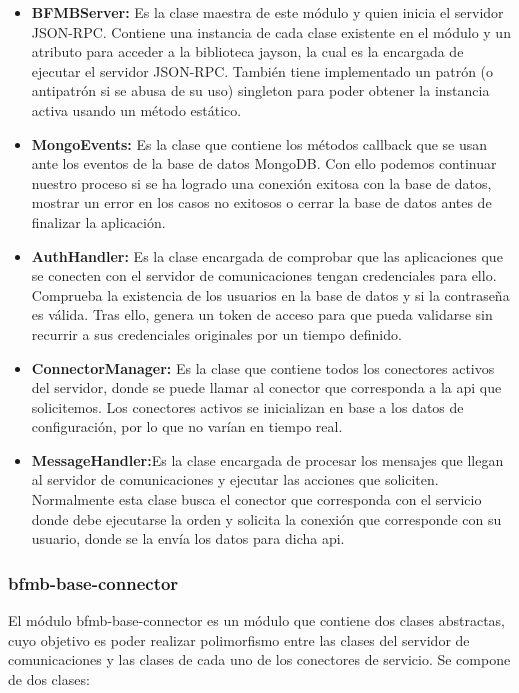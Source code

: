 \documentclass[spanish,12pt, a4paper, twoside]{paper}
\begin{document}
\begin{itemize}
\item\textbf{BFMBServer:} Es la clase maestra de este módulo y quien inicia el servidor JSON-RPC. Contiene una instancia de cada clase existente en el módulo y un atributo para acceder a la biblioteca jayson, la cual es la encargada de ejecutar el servidor JSON-RPC. También tiene implementado un patrón (o antipatrón si se abusa de su uso) singleton para poder obtener la instancia activa usando un método estático.
\item\textbf{MongoEvents:} Es la clase que contiene los métodos callback que se usan ante los eventos de la base de datos MongoDB. Con ello podemos continuar nuestro proceso si se ha logrado una conexión exitosa con la base de datos, mostrar un error en los casos no exitosos o cerrar la base de datos antes de finalizar la aplicación.
\item\textbf{AuthHandler:} Es la clase encargada de comprobar que las aplicaciones que se conecten con el servidor de comunicaciones tengan credenciales para ello. Comprueba la existencia de los usuarios en la base de datos y si la contraseña es válida. Tras ello, genera un token de acceso para que pueda validarse sin recurrir a sus credenciales originales por un tiempo definido.
\item\textbf{ConnectorManager:} Es la clase que contiene todos los conectores activos del servidor, donde se puede llamar al conector que corresponda a la api que solicitemos. Los conectores activos se inicializan en base a los datos de configuración, por lo que no varían en tiempo real.
\item\textbf{MessageHandler:}Es la clase encargada de procesar los mensajes que llegan al servidor de comunicaciones y ejecutar las acciones que soliciten. Normalmente esta clase busca el conector que corresponda con el servicio donde debe ejecutarse la orden y solicita la conexión que corresponde con su usuario, donde se la envía los datos para dicha api.
\end{itemize}

\subsubsection{bfmb-base-connector}

El módulo bfmb-base-connector es un módulo que contiene dos clases abstractas, cuyo objetivo es poder realizar polimorfismo entre las clases del servidor de comunicaciones y las clases de cada uno de los conectores de servicio. Se compone de dos clases:
\end{document}

